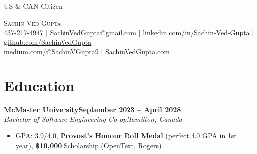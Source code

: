\documentclass[letterpaper,10pt]{article}
\newcommand{\entry}[4]{\textbf{#1}\hfill\textbf{\small #2}\\\textit{\small #3}\hfill\textit{\small #4}\par}
\begin{document}
{\small US \& CAN Citizen}\vspace{-5pt}
\begin{center}
{\Huge\scshape Sachin Ved Gupta}\\[4pt]
{\small 437-217-4947 $|$ \href{mailto:SachinVedGupta@gmail.com}{SachinVedGupta@gmail.com} $|$
\href{https://linkedin.com/in/Sachin-Ved-Gupta}{linkedin.com/in/Sachin-Ved-Gupta} $|$ \href{https://github.com/SachinVedGupta}{github.com/SachinVedGupta}\\[2pt]\href{https://medium.com/@sachinvgupta9}{medium.com/@SachinVGupta9} $|$ \href{https://sachinvedgupta.com/}{SachinVedGupta.com}}
\end{center}\vspace{-9pt}
\section{Education}
\entry{McMaster University}{September 2023 -- April 2028}{Bachelor of Software Engineering Co-op}{Hamilton, Canada}
\begin{itemize}\small
\item GPA: 3.9/4.0, \textbf{Provost's Honour Roll Medal} (perfect 4.0 GPA in 1st year), \textbf{\$10,000} Scholarship (OpenText, Rogers)
\end{itemize}
\end{document}
